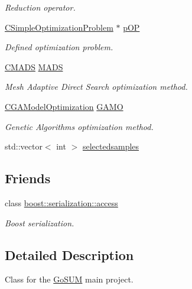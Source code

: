 \begin{DoxyCompactItemize}
\begin{DoxyCompactList}\small\item\em Reduction operator. \end{DoxyCompactList}\item 
\hyperlink{class_go_s_u_m_1_1_c_simple_optimization_problem}{C\-Simple\-Optimization\-Problem} $\ast$ \hyperlink{class_go_s_u_m_1_1_c_container_adeb8fce52629b3f9172a4ff0187ec040}{p\-O\-P}
\begin{DoxyCompactList}\small\item\em Defined optimization problem. \end{DoxyCompactList}\item 
\hyperlink{class_c_m_a_d_s}{C\-M\-A\-D\-S} \hyperlink{class_go_s_u_m_1_1_c_container_a7b9a7fe1992a3483366952a19b1ee484}{M\-A\-D\-S}
\begin{DoxyCompactList}\small\item\em Mesh Adaptive Direct Search optimization method. \end{DoxyCompactList}\item 
\hyperlink{class_c_g_a_model_optimization}{C\-G\-A\-Model\-Optimization} \hyperlink{class_go_s_u_m_1_1_c_container_aea0201dad816660f2ee30bfa1b95093e}{G\-A\-M\-O}
\begin{DoxyCompactList}\small\item\em Genetic Algorithms optimization method. \end{DoxyCompactList}\item 
std\-::vector$<$ int $>$ \hyperlink{class_go_s_u_m_1_1_c_container_a9a189048aeeaecf4aead1b0b62ff0814}{selectedsamples}
\end{DoxyCompactItemize}
\subsection*{Friends}
\begin{DoxyCompactItemize}
\item 
class \hyperlink{class_go_s_u_m_1_1_c_container_ac98d07dd8f7b70e16ccb9a01abf56b9c}{boost\-::serialization\-::access}
\begin{DoxyCompactList}\small\item\em Boost serialization. \end{DoxyCompactList}\end{DoxyCompactItemize}


\subsection{Detailed Description}
Class for the \hyperlink{struct_go_s_u_m}{Go\-S\-U\-M} main project. 

